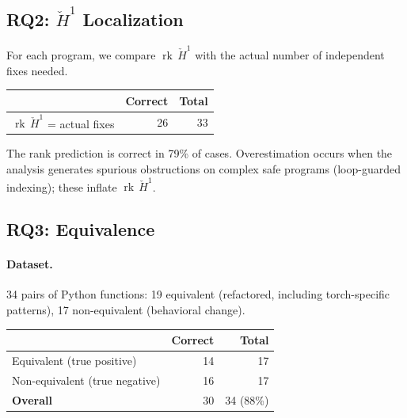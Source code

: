 \documentclass[acmsmall,screen,review,anonymous]{acmart}
\theoremstyle{remark}
\newcommand{\Hc}[1]{\check{H}^{#1}}
\newcommand{\rk}{\operatorname{rk}}
\begin{document}
\subsection{RQ2: $\Hc{1}$ Localization}

For each program, we compare $\rk\,\Hc{1}$ with the actual
number of independent fixes needed.

\begin{center}
\begin{tabular}{lrr}
\toprule
& \textbf{Correct} & \textbf{Total} \\
\midrule
$\rk\,\Hc{1}$ = actual fixes & 26 & 33 \\
\bottomrule
\end{tabular}
\end{center}

The rank prediction is correct in 79\% of cases.  Overestimation
occurs when the analysis generates spurious obstructions on
complex safe programs (loop-guarded indexing); these inflate
$\rk\,\Hc{1}$.

\subsection{RQ3: Equivalence}

\paragraph{Dataset.} 34 pairs of Python functions: 19 equivalent
(refactored, including torch-specific patterns), 17 non-equivalent
(behavioral change).

\begin{center}
\begin{tabular}{lrr}
\toprule
& \textbf{Correct} & \textbf{Total} \\
\midrule
Equivalent (true positive)     & 14 & 17 \\
Non-equivalent (true negative) & 16 & 17 \\
\textbf{Overall}               & 30 & 34 (88\%)\\
\bottomrule
\end{tabular}
\end{center}
\end{document}
